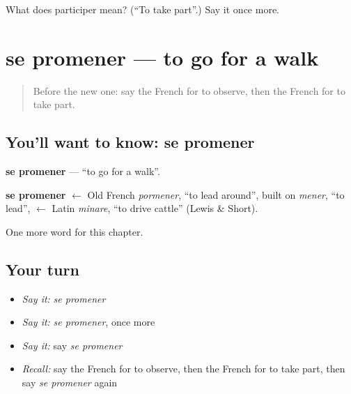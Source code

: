 \begin{tcolorbox}[breakable,colback=teal!4,colframe=teal!35!black,title={Before you move on}]
What does participer mean? (\textquotedblleft{}To take part\textquotedblright{}.) Say it once more.
\end{tcolorbox}
\section[se promener]{se promener — to go for a walk}

\label{lesson:FR-C148-promener}



\begin{quote}
Before the new one: say the French for to observe, then the French for to take part.
\end{quote}

\subsection*{You'll want to know: se promener}
\textbf{se promener} — \textquotedblleft{}to go for a walk\textquotedblright{}.

\begin{cousinweb}
\textbf{se promener} $\leftarrow$ Old French \emph{pormener}, \textquotedblleft{}to lead around\textquotedblright{}, built on \emph{mener}, \textquotedblleft{}to lead\textquotedblright{}, $\leftarrow$ Latin \emph{minare}, \textquotedblleft{}to drive cattle\textquotedblright{} (Lewis \& Short).
\end{cousinweb}

\begin{grammarlens}[title={What you've built}]
One more word for this chapter.
\end{grammarlens}

\subsection*{Your turn}
\begin{itemize}
\raggedright
  \item \emph{Say it:} \emph{se promener}
  \item \emph{Say it:} \emph{se promener}, once more
  \item \emph{Say it:} say \emph{se promener}
  \item \emph{Recall:} say the French for to observe, then the French for to take part, then say \emph{se promener} again
\end{itemize}


